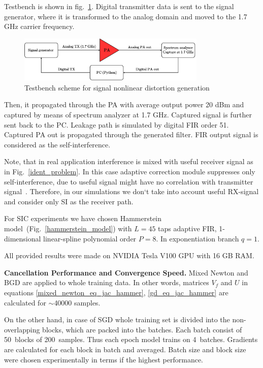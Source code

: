 \documentclass[12pt]{article}
\begin{document}
Testbench is shown in fig.~\ref{install}. Digital transmitter data is sent to the signal generator, where it is transformed to the analog domain and moved to the 1.7 GHz carrier frequency.
\begin{figure}[h!]
    \centering
    \captionsetup{justification=centering}
    \centerline{\includegraphics[width = 0.8\textwidth]{figures/install/install.pdf}}
    \caption{Testbench scheme for signal nonlinear distortion generation}
    \label{install}
\end{figure}
Then, it propagated through the PA with average output power 20 dBm and captured by means of spectrum analyzer at 1.7 GHz. Captured signal is further sent back to the PC. Leakage path is simulated by digital FIR order 51. Captured PA out is propagated through the generated filter. FIR output signal is considered as the self-interference.

Note, that in real application interference is mixed with useful receiver signal as in Fig.~\ref{ident_problem}. In this case adaptive correction module suppresses only self-interference, due to useful signal might have no correlation with transmitter signal~\cite{haykin}. Therefore, in our simulations we don`t take into account useful RX-signal and consider only SI as the receiver path.

For SIC experiments we have chosen Hammerstein model~(Fig.~\ref{hammerstein_model}) with $L=45$ taps adaptive FIR, 1-dimensional linear-spline polynomial order $P=8$. In exponentiation branch $q=1$.

All provided results were made on NVIDIA Tesla V100 GPU with 16 GB RAM.

\textbf{Cancellation Performance and Convergence Speed.}
Mixed Newton and BGD are applied to whole training data. In other words, matrices $V_f$ and $U$ in equations \eqref{mixed_newton_eq_jac_hammer}, \eqref{gd_eq_jac_hammer} are calculated for $\sim$40000 samples. 

On the other hand, in case of SGD whole training set is divided into the non-overlapping blocks, which are packed into the batches. Each batch consist of 50~blocks of 200~samples. Thus each epoch model trains on 4~batches. Gradients are calculated for each block in batch and averaged. Batch size and block size were chosen experimentally in terms if the highest performance.
\end{document}
